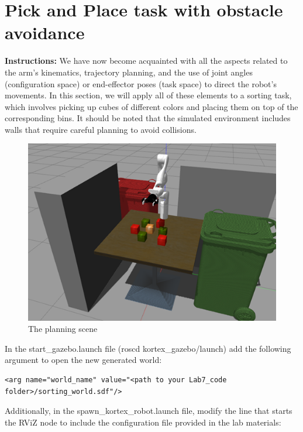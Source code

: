 \documentclass[12pt]{article}
\begin{document}
\section{Pick and Place task with obstacle avoidance}

\textbf{Instructions:}
We have now become acquainted with all the aspects related to the arm's kinematics, trajectory planning, and the use of joint angles (configuration space) or end-effector poses (task space) to direct the robot's movements. In this section, we will apply all of these elements to a sorting task, which involves picking up cubes of different colors and placing them on top of the corresponding bins. It should be noted that the simulated environment includes walls that require careful planning to avoid collisions.

\begin{figure}[H]
    \vspace{-10pt}
    \centering\includegraphics[width=12cm]{images/lab73.png}\vspace{-10pt}
    \caption{The planning scene}\label{fig:planning}
    \end{figure}


In the start\_gazebo.launch file (roscd kortex\_gazebo/launch) add the following argument to open the new generated world:

\begin{verbatim}
<arg name="world_name" value="<path to your Lab7_code folder>/sorting_world.sdf"/>
\end{verbatim}

Additionally, in the spawn\_kortex\_robot.launch file, modify the line that starts the RViZ node to include the configuration file provided in the lab materials:
\end{document}

